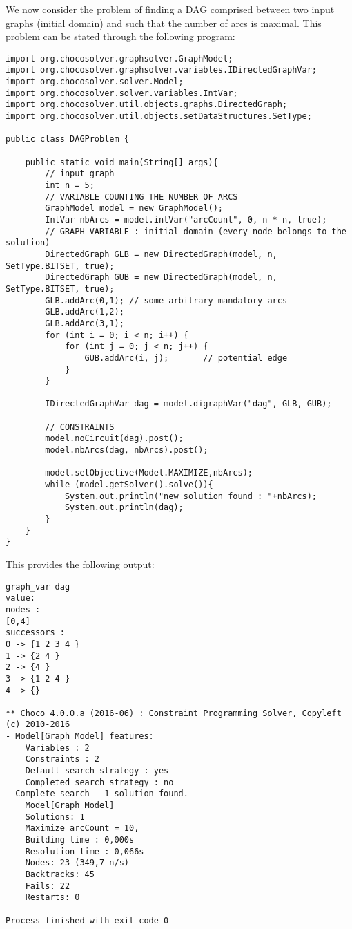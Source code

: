 \documentclass{article}
\begin{document}
We now consider the problem of finding a DAG comprised between two input graphs (initial domain) and such that the number of arcs is maximal. 
This problem can be stated through the following program:
\begin{lstlisting}
import org.chocosolver.graphsolver.GraphModel;
import org.chocosolver.graphsolver.variables.IDirectedGraphVar;
import org.chocosolver.solver.Model;
import org.chocosolver.solver.variables.IntVar;
import org.chocosolver.util.objects.graphs.DirectedGraph;
import org.chocosolver.util.objects.setDataStructures.SetType;

public class DAGProblem {

	public static void main(String[] args){
		// input graph
		int n = 5;
		// VARIABLE COUNTING THE NUMBER OF ARCS
		GraphModel model = new GraphModel();
		IntVar nbArcs = model.intVar("arcCount", 0, n * n, true);
		// GRAPH VARIABLE : initial domain (every node belongs to the solution)
		DirectedGraph GLB = new DirectedGraph(model, n, SetType.BITSET, true);
		DirectedGraph GUB = new DirectedGraph(model, n, SetType.BITSET, true);
		GLB.addArc(0,1); // some arbitrary mandatory arcs
		GLB.addArc(1,2);
		GLB.addArc(3,1);
		for (int i = 0; i < n; i++) {
			for (int j = 0; j < n; j++) {
				GUB.addArc(i, j);		// potential edge
			}
		}

		IDirectedGraphVar dag = model.digraphVar("dag", GLB, GUB);

		// CONSTRAINTS
		model.noCircuit(dag).post();
		model.nbArcs(dag, nbArcs).post();

		model.setObjective(Model.MAXIMIZE,nbArcs);
		while (model.getSolver().solve()){
			System.out.println("new solution found : "+nbArcs);
			System.out.println(dag);
		}
	}
}
\end{lstlisting}

This provides the following output:

\begin{lstlisting}
graph_var dag
value: 
nodes : 
[0,4]
successors : 
0 -> {1 2 3 4 }
1 -> {2 4 }
2 -> {4 }
3 -> {1 2 4 }
4 -> {}

** Choco 4.0.0.a (2016-06) : Constraint Programming Solver, Copyleft (c) 2010-2016
- Model[Graph Model] features:
	Variables : 2
	Constraints : 2
	Default search strategy : yes
	Completed search strategy : no
- Complete search - 1 solution found.
	Model[Graph Model]
	Solutions: 1
	Maximize arcCount = 10,
	Building time : 0,000s
	Resolution time : 0,066s
	Nodes: 23 (349,7 n/s) 
	Backtracks: 45
	Fails: 22
	Restarts: 0

Process finished with exit code 0
\end{lstlisting}
\end{document}
